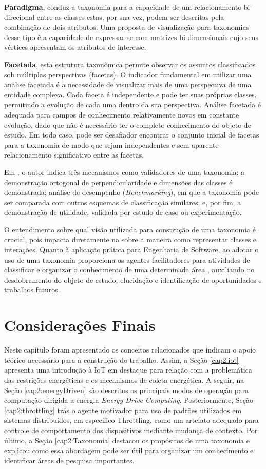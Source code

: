 \textbf{Paradigma}, conduz a taxonomia para a capacidade de um relacionamento bi-direcional entre as classes estas, por sua vez, podem ser descritas pela combinação de dois atributos. Uma proposta de visualização para taxonomias desse tipo é a capacidade de expressar-se com matrizes bi-dimensionais cujo seus vértices apresentam os atributos de interesse.

\textbf{Facetada}, esta estrutura taxonômica permite observar os assuntos classificados sob múltiplas perspectivas (facetas). O indicador fundamental em utilizar uma análise facetada é a necessidade de visualizar mais de uma perspectiva de uma entidade complexa. Cada faceta é independente e pode ter suas próprias classes, permitindo a evolução de cada uma dentro da sua perspectiva. Análise facetada é adequada para campos de conhecimento relativamente novos em constante evolução, dado que não é necessário ter o completo conhecimento do objeto de estudo. Em todo caso, pode ser desafiador encontrar o conjunto inicial de facetas para a taxonomia de modo que sejam independentes e sem aparente relacionamento significativo entre as facetas.

Em \cite{smite_empirically_2014}, o autor indica três mecanismos como validadores de uma taxonomia: a demonstração ortogonal de perpendicularidade e dimensões das classes é demonstrada; análise de desempenho (\textit{Benchmarking}), em que a taxonomia pode ser comparada com outros esquemas de classificação similares; e, por fim, a demonstração de utilidade, validada por estudo de caso ou experimentação.

O entendimento sobre qual visão utilizada para construção de uma taxonomia é crucial, pois impacta diretamente na sobre a maneira como representar classes e interações. Quanto à aplicação prática para Engenharia de Software, ao adotar o uso de uma taxonomia proporciona os agentes facilitadores para atividades de classificar e organizar o conhecimento de uma determinada área \cite{usman_taxonomies_2017}, auxiliando no desdobramento do objeto de estudo, elucidação e identificação de oportunidades e trabalhos futuros.

\section{Considerações Finais}
 \label{cap2:consideracoesFinais}
 
 Neste capítulo foram apresentado os conceitos relacionados que indicam o apoio teórico necessário para a construção do trabalho. Assim, a Seção \ref{cap2:iot} apresenta uma introdução à IoT em destaque para relação com a problemática das restrições energéticas e os mecanismos de coleta energética. A seguir, na Seção \ref{cap2:energyDriven} são descritos os principais modos de operação para computação dirigida a energia \textit{Energy-Drive Computing}. Posteriormente, Seção \ref{cap2:throttling} trás o agente motivador para uso de padrões utilizados em sistemas distribuídos, em especifico Throttling, como um artefato adequado para controle de comportamento dos dispositivos mediante mudança de contexto. Por último, a Seção \ref{cap2:Taxonomia} destacou os propósitos de uma taxonomia e explicou como essa abordagem pode ser útil para organizar um conhecimento e identificar áreas de pesquisa importantes.
